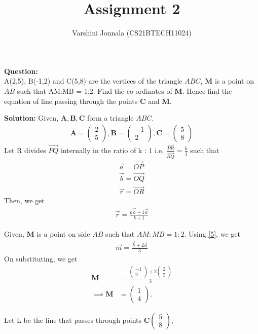 \documentclass[journal,12pt,twocolumn]{IEEEtran}
\title{Assignment 2}
\author{Varshini Jonnala (CS21BTECH11024)}
\let\vec\mathbf
\newcommand{\myvec}[1]{\ensuremath{\begin{pmatrix}#1\end{pmatrix}}}
\begin{document}
    \maketitle
    \textbf{Question: }\\
      A(2,5), B(-1,2) and C(5,8) are the vertices of the triangle $ABC$, $\vec{M}$ is a point on $AB$ such that AM:MB = 1:2. Find the co-ordinates of $\vec{M}$. Hence find the equation of line passing through the points $\vec{C}$ and $\vec{M}$.


    \textbf{Solution: }
     Given, $\vec{A}, \vec{B}, \vec{C}$ form a triangle $ABC$.
	\begin{align}
		\vec{A} = \myvec{2 \\ 5} ,
		\vec{B} = \myvec{-1 \\ 2},
		\vec{C} = \myvec{5 \\ 8}
	\end{align}
   Let R divides $\overrightarrow{PQ}$ internally in the ratio of k : 1 i.e, $\frac{\overrightarrow{PR}}{\overrightarrow{RQ}} = \frac{k}{1}$ such that
    \begin{align}
        \overrightarrow{a} = \overrightarrow{OP}\\
        \overrightarrow{b} = \overrightarrow{OQ}\\
        \overrightarrow{r} = \overrightarrow{OR}
    \end{align}
    Then, we get 
    \begin{align}
       \label{5} \overrightarrow{r} = \frac{k\overrightarrow{b}+1\overrightarrow{a}}{k+1}
    \end{align}

    Given, $\vec{M}$ is a point on side $AB$ such that $AM:MB = 1:2$. 
        Using \eqref{5}, we get
    \begin{align}
        \overrightarrow{m} = \frac{\overrightarrow{b}+2\overrightarrow{a}}{3}
    \end{align}
    On substituting, we get
    \begin{align}
        \vec{M} &= \frac{\myvec{-1 \\ 2} + 2\myvec{2 \\ 5}}{3}\\ \implies \vec{M} &= \myvec{1\\4}.
    \end{align}
    
    Let L be the line that passes through points $\vec{C}\myvec{5\\8}$,
   
\end{document}
